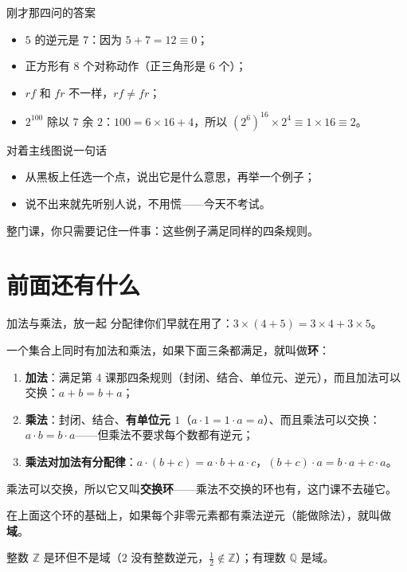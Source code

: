 \documentclass[10pt]{beamer}
\begin{document}
\begin{frame}{刚才那四问的答案}
  \begin{itemize}
    \item \(5\) 的逆元是 \(7\)：因为 \(5+7=12\equiv0\)；
    \item 正方形有 \(8\) 个对称动作（正三角形是 \(6\) 个）；
    \item \(rf\) 和 \(fr\) 不一样，\(rf\neq fr\)；
    \item \(2^{100}\) 除以 \(7\) 余 \(2\)：\(100=6\times16+4\)，所以
      \((2^{6})^{16}\times2^{4}\equiv1\times16\equiv2\)。
  \end{itemize}
\end{frame}

\begin{frame}{对着主线图说一句话}
  \begin{itemize}
    \item 从黑板上任选一个点，说出它是什么意思，再举一个例子；
    \item 说不出来就先听别人说，不用慌——今天不考试。
  \end{itemize}
  \pause
  \begin{center}
    {\large 整门课，你只需要记住一件事：这些例子满足同样的四条规则。}
  \end{center}
\end{frame}

\section{前面还有什么}

\begin{frame}{加法与乘法，放一起}
  \footnotesize
  \setlength{\parskip}{0pt}
  \setlength{\itemsep}{1pt}
  \noindent 分配律你们早就在用了：\(3\times(4+5)=3\times4+3\times5\)。
  \begin{definition}[环]
    一个集合上同时有加法和乘法，如果下面三条都满足，就叫做\textbf{环}：
    \begin{enumerate}
      \item \textbf{加法}：满足第 4 课那四条规则（封闭、结合、单位元、逆元），而且加法可以交换：\(a+b=b+a\)；
      \item \textbf{乘法}：封闭、结合、\textbf{有单位元 \(1\)}（\(a\cdot1=1\cdot a=a\)）、而且乘法可以交换：\(a\cdot b=b\cdot a\)——但乘法不要求每个数都有逆元；
      \item \textbf{乘法对加法有分配律}：\(a\cdot(b+c)=a\cdot b+a\cdot c\)，\((b+c)\cdot a=b\cdot a+c\cdot a\)。
    \end{enumerate}
    乘法可以交换，所以它又叫\textbf{交换环}——乘法不交换的环也有，这门课不去碰它。
  \end{definition}
  \pause
  \begin{definition}[域]
    在上面这个环的基础上，如果每个非零元素都有乘法逆元（能做除法），就叫做\textbf{域}。
  \end{definition}
  \pause
  \begin{center}
    \small 整数 \(\mathbb{Z}\) 是环但不是域（\(2\) 没有整数逆元，\(\tfrac12\notin\mathbb{Z}\)）；有理数 \(\mathbb{Q}\) 是域。
  \end{center}
\end{frame}
\end{document}
